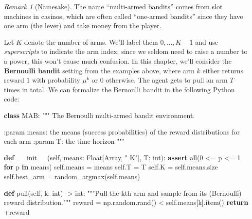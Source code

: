 \documentclass[
  letterpaper,
  DIV=11,
  numbers=noendperiod]{scrreprt}
\newenvironment{Shaded}{\begin{snugshade}}{\end{snugshade}}
\newcommand{\BuiltInTok}[1]{\textcolor[rgb]{0.00,0.23,0.31}{#1}}
\newcommand{\CommentTok}[1]{\textcolor[rgb]{0.37,0.37,0.37}{#1}}
\newcommand{\ControlFlowTok}[1]{\textcolor[rgb]{0.00,0.23,0.31}{\textbf{#1}}}
\newcommand{\DecValTok}[1]{\textcolor[rgb]{0.68,0.00,0.00}{#1}}
\newcommand{\FunctionTok}[1]{\textcolor[rgb]{0.28,0.35,0.67}{#1}}
\newcommand{\KeywordTok}[1]{\textcolor[rgb]{0.00,0.23,0.31}{\textbf{#1}}}
\newcommand{\NormalTok}[1]{\textcolor[rgb]{0.00,0.23,0.31}{#1}}
\newcommand{\OperatorTok}[1]{\textcolor[rgb]{0.37,0.37,0.37}{#1}}
\newcommand{\StringTok}[1]{\textcolor[rgb]{0.13,0.47,0.30}{#1}}
\newcommand{\VariableTok}[1]{\textcolor[rgb]{0.07,0.07,0.07}{#1}}
\theoremstyle{plain}
\theoremstyle{plain}
\theoremstyle{definition}
\theoremstyle{definition}
\theoremstyle{remark}
\newtheorem{refremark}{Remark}[chapter]
\begin{document}
\begin{refremark}[Namesake]
The name ``multi-armed bandits'' comes from slot machines in casinos,
which are often called ``one-armed bandits'' since they have one arm
(the lever) and take money from the player.

\label{rem-multi-armed}

\end{refremark}

Let \(K\) denote the number of arms. We'll label them \(0, \dots, K-1\)
and use \emph{superscripts} to indicate the arm index; since we seldom
need to raise a number to a power, this won't cause much confusion. In
this chapter, we'll consider the \textbf{Bernoulli bandit} setting from
the examples above, where arm \(k\) either returns reward \(1\) with
probability \(\mu^k\) or \(0\) otherwise. The agent gets to pull an arm
\(T\) times in total. We can formalize the Bernoulli bandit in the
following Python code:

\begin{Shaded}
\begin{Highlighting}[]
\KeywordTok{class}\NormalTok{ MAB:}
    \CommentTok{"""}
\CommentTok{    The Bernoulli multi{-}armed bandit environment.}

\CommentTok{    :param means: the means (success probabilities) of the reward distributions for each arm}
\CommentTok{    :param T: the time horizon}
\CommentTok{    """}

    \KeywordTok{def} \FunctionTok{\_\_init\_\_}\NormalTok{(}\VariableTok{self}\NormalTok{, means: Float[Array, }\StringTok{" K"}\NormalTok{], T: }\BuiltInTok{int}\NormalTok{):}
        \ControlFlowTok{assert} \BuiltInTok{all}\NormalTok{(}\DecValTok{0} \OperatorTok{\textless{}=}\NormalTok{ p }\OperatorTok{\textless{}=} \DecValTok{1} \ControlFlowTok{for}\NormalTok{ p }\KeywordTok{in}\NormalTok{ means)}
        \VariableTok{self}\NormalTok{.means }\OperatorTok{=}\NormalTok{ means}
        \VariableTok{self}\NormalTok{.T }\OperatorTok{=}\NormalTok{ T}
        \VariableTok{self}\NormalTok{.K }\OperatorTok{=} \VariableTok{self}\NormalTok{.means.size}
        \VariableTok{self}\NormalTok{.best\_arm }\OperatorTok{=}\NormalTok{ random\_argmax(}\VariableTok{self}\NormalTok{.means)}

    \KeywordTok{def}\NormalTok{ pull(}\VariableTok{self}\NormalTok{, k: }\BuiltInTok{int}\NormalTok{) }\OperatorTok{{-}\textgreater{}} \BuiltInTok{int}\NormalTok{:}
        \CommentTok{"""Pull the \textasciigrave{}k\textasciigrave{}{-}th arm and sample from its (Bernoulli) reward distribution."""}
\NormalTok{        reward }\OperatorTok{=}\NormalTok{ np.random.rand() }\OperatorTok{\textless{}} \VariableTok{self}\NormalTok{.means[k].item()}
        \ControlFlowTok{return} \OperatorTok{+}\NormalTok{reward}
\end{Highlighting}
\end{Shaded}
\end{document}
